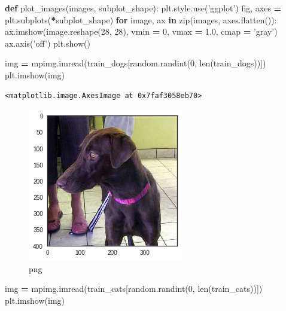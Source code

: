\documentclass[]{book}
\newenvironment{Shaded}{\begin{snugshade}}{\end{snugshade}}
\newcommand{\KeywordTok}[1]{\textcolor[rgb]{0.13,0.29,0.53}{\textbf{#1}}}
\newcommand{\DecValTok}[1]{\textcolor[rgb]{0.00,0.00,0.81}{#1}}
\newcommand{\FloatTok}[1]{\textcolor[rgb]{0.00,0.00,0.81}{#1}}
\newcommand{\StringTok}[1]{\textcolor[rgb]{0.31,0.60,0.02}{#1}}
\newcommand{\ControlFlowTok}[1]{\textcolor[rgb]{0.13,0.29,0.53}{\textbf{#1}}}
\newcommand{\OperatorTok}[1]{\textcolor[rgb]{0.81,0.36,0.00}{\textbf{#1}}}
\newcommand{\BuiltInTok}[1]{#1}
\newcommand{\NormalTok}[1]{#1}
\theoremstyle{definition}
\theoremstyle{definition}
\theoremstyle{definition}
\theoremstyle{remark}
\begin{document}
\begin{Shaded}
\begin{Highlighting}[]
\KeywordTok{def}\NormalTok{ plot_images(images, subplot_shape):}
\NormalTok{    plt.style.use(}\StringTok{'ggplot'}\NormalTok{)}
\NormalTok{    fig, axes }\OperatorTok{=}\NormalTok{ plt.subplots(}\OperatorTok{*}\NormalTok{subplot_shape)}
    \ControlFlowTok{for}\NormalTok{ image, ax }\KeywordTok{in} \BuiltInTok{zip}\NormalTok{(images, axes.flatten()):}
\NormalTok{        ax.imshow(image.reshape(}\DecValTok{28}\NormalTok{, }\DecValTok{28}\NormalTok{), vmin }\OperatorTok{=} \DecValTok{0}\NormalTok{, vmax }\OperatorTok{=} \FloatTok{1.0}\NormalTok{, cmap }\OperatorTok{=} \StringTok{'gray'}\NormalTok{)}
\NormalTok{        ax.axis(}\StringTok{'off'}\NormalTok{)}
\NormalTok{    plt.show()}
\end{Highlighting}
\end{Shaded}

\begin{Shaded}
\begin{Highlighting}[]
\NormalTok{img }\OperatorTok{=}\NormalTok{ mpimg.imread(train_dogs[random.randint(}\DecValTok{0}\NormalTok{, }\BuiltInTok{len}\NormalTok{(train_dogs))])}
\NormalTok{plt.imshow(img)}
\end{Highlighting}
\end{Shaded}

\begin{verbatim}
<matplotlib.image.AxesImage at 0x7faf3058eb70>
\end{verbatim}

\begin{figure}
\centering
\includegraphics{CNTK-Transfer-Cats-Dogs_files/CNTK-Transfer-Cats-Dogs_33_1.png}
\caption{png}
\end{figure}

\begin{Shaded}
\begin{Highlighting}[]
\NormalTok{img }\OperatorTok{=}\NormalTok{ mpimg.imread(train_cats[random.randint(}\DecValTok{0}\NormalTok{, }\BuiltInTok{len}\NormalTok{(train_cats))])}
\NormalTok{plt.imshow(img)}
\end{Highlighting}
\end{Shaded}
\end{document}
